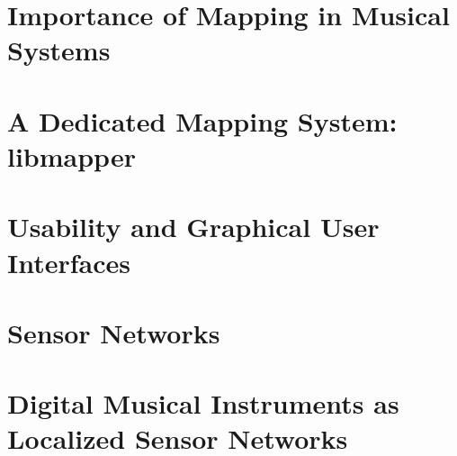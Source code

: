 \section{Importance of Mapping in Musical Systems}

\section{A Dedicated Mapping System: libmapper}

\section{Usability and Graphical User Interfaces}

\section{Sensor Networks}

\section{Digital Musical Instruments as Localized Sensor Networks}
